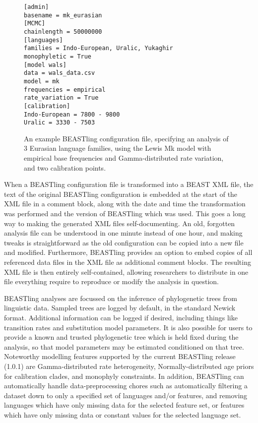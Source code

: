 \documentclass[twocolumn,10pt]{scrartcl}
\begin{document}
\begin{figure}[t]
	\begin{verbatim}[admin]
basename = mk_eurasian
[MCMC]
chainlength = 50000000
[languages]
families = Indo-European, Uralic, Yukaghir
monophyletic = True
[model wals]
data = wals_data.csv
model = mk
frequencies = empirical
rate_variation = True
[calibration]
Indo-European = 7800 - 9800
Uralic = 3330 - 7503\end{verbatim}
	\caption{An example BEASTling configuration file, specifying an analysis of 3 Eurasian language families, using the Lewis Mk model with empirical base frequencies and Gamma-distributed rate variation, and two calibration points.}
\label{fig:config}
\end{figure}

When a BEASTling configuration file is transformed into a BEAST XML file, the text of the original BEASTling configuration is embedded at the start of the XML file in a comment block, along with the date and time the transformation was performed and the version of BEASTling which was used.  This goes a long way to making the generated XML files self-documenting.  An old, forgotten analysis file can be understood in one minute instead of one hour, and making tweaks is straightforward as the old configuration can be copied into a new file and modified.  Furthermore, BEASTling provides an option to embed copies of all referenced data files in the XML file as additional comment blocks.  The resulting XML file is then entirely self-contained, allowing researchers to distribute in one file everything require to reproduce or modify the analysis in question.

BEASTling analyses are focussed on the inference of phylogenetic trees from linguistic data.  Sampled trees are logged by default, in the standard Newick format.  Additional information can be logged if desired, including things like transition rates and substitution model parameters.  It is also possible for users to provide a known and trusted phylogenetic tree which is held fixed during the analysis, so that model parameters may be estimated conditioned on that tree.  Noteworthy modelling features supported by the current BEASTling release (1.0.1) are Gamma-distributed rate heterogeneity, Normally-distributed age priors for calibration clades, and monophyly constraints.  In addition, BEASTling can automatically handle data-preprocessing chores such as automatically filtering a dataset down to only a specified set of languages and/or features, and removing languages which have only missing data for the selected feature set, or features which have only missing data or constant values for the selected language set.
\end{document}
